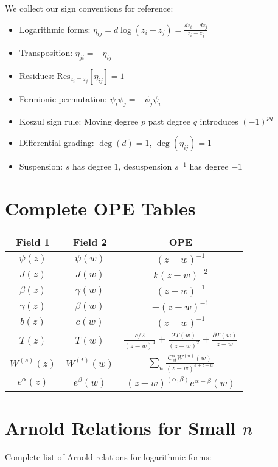 We collect our sign conventions for reference:
\begin{itemize}
\item Logarithmic forms: $\eta_{ij} = d\log(z_i - z_j) = \frac{dz_i - dz_j}{z_i - z_j}$
\item Transposition: $\eta_{ji} = -\eta_{ij}$
\item Residues: $\text{Res}_{z_i=z_j}[\eta_{ij}] = 1$
\item Fermionic permutation: $\psi_i\psi_j = -\psi_j\psi_i$
\item Koszul sign rule: Moving degree $p$ past degree $q$ introduces $(-1)^{pq}$
\item Differential grading: $\deg(d) = 1$, $\deg(\eta_{ij}) = 1$
\item Suspension: $s$ has degree $1$, desuspension $s^{-1}$ has degree $-1$
\end{itemize}
 
\section{Complete OPE Tables}
 
\begin{center}
\begin{tabular}{|c|c|c|}
\hline
Field 1 & Field 2 & OPE \\
\hline
$\psi(z)$ & $\psi(w)$ & $(z-w)^{-1}$ \\
$J(z)$ & $J(w)$ & $k(z-w)^{-2}$ \\
$\beta(z)$ & $\gamma(w)$ & $(z-w)^{-1}$ \\
$\gamma(z)$ & $\beta(w)$ & $-(z-w)^{-1}$ \\
$b(z)$ & $c(w)$ & $(z-w)^{-1}$ \\
$T(z)$ & $T(w)$ & $\frac{c/2}{(z-w)^4} + \frac{2T(w)}{(z-w)^2} + \frac{\partial T(w)}{z-w}$ \\
$W^{(s)}(z)$ & $W^{(t)}(w)$ & $\sum_u \frac{C^u_{st} W^{(u)}(w)}{(z-w)^{s+t-u}}$ \\
$e^\alpha(z)$ & $e^\beta(w)$ & $(z-w)^{(\alpha,\beta)} e^{\alpha+\beta}(w)$ \\
\hline
\end{tabular}
\end{center}
 
\section{Arnold Relations for Small $n$}
 
Complete list of Arnold relations for logarithmic forms:
 
